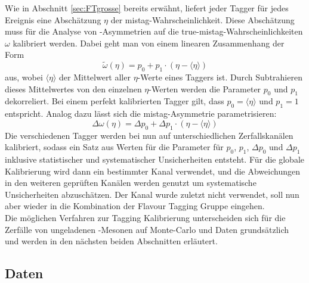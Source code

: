 Wie in Abschnitt \ref{sec:FTgrosse} bereits erwähnt, liefert jeder Tagger für jedes Ereignis eine Abschätzung $\eta$ der mistag-Wahrscheinlichkeit. Diese Abschätzung muss für die Analyse von \CP-Asymmetrien auf die true-mistag-Wahrscheinlichkeiten $\omega$ kalibriert werden. Dabei geht man von einem linearen Zusammenhang der Form
\begin{equation}
\widetilde{\omega}(\eta)=p_0+p_1\cdot\left(\eta-\langle\eta\rangle\right)\label{eq:linear}
\end{equation}
aus, wobei $\langle\eta\rangle$ der Mittelwert aller $\eta$-Werte eines Taggers ist. Durch Subtrahieren dieses Mittelwertes von den einzelnen $\eta$-Werten werden die Parameter $p_0$ und $p_1$ dekorreliert. Bei einem perfekt kalibrierten Tagger gilt, dass $p_0=\langle\eta\rangle$ und $p_1=1$ entspricht. Analog dazu lässt sich die mistag-Asymmetrie parametrisieren:
\begin{equation}
\Delta\omega(\eta)=\Delta p_0+\Delta p_1\cdot\left(\eta-\langle\eta\rangle\right)\label{eq:lineardelta}
\end{equation}
Die verschiedenen Tagger werden bei \lhcb nun auf unterschiedlichen Zerfallskanälen kalibriert, sodass ein Satz aus Werten für die Parameter für $p_0$, $p_1$, $\Delta p_0$ und $\Delta p_1$ inklusive statistischer und systematischer Unsicherheiten entsteht. Für die globale Kalibrierung wird dann ein bestimmter Kanal verwendet, und die Abweichungen in den weiteren geprüften Kanälen werden genutzt um systematische Unsicherheiten abzuschätzen. Der Kanal \BdToDpi wurde zuletzt nicht verwendet, soll nun aber wieder in die Kombination der Flavour Tagging Gruppe eingehen.\\
Die möglichen Verfahren zur Tagging Kalibrierung unterscheiden sich für die Zerfälle von ungeladenen \B-Mesonen auf Monte-Carlo und Daten grundsätzlich und werden in den nächsten beiden Abschnitten erläutert.   

\subsection{Daten}\label{sec:kalibrierungDaten}

